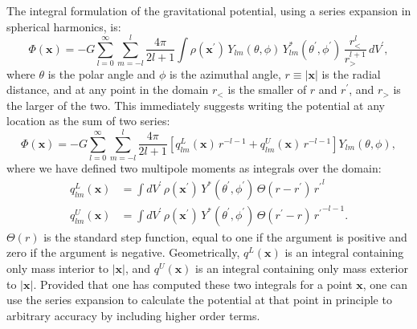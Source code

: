 \documentclass[12pt]{article}
\begin{document}
The integral formulation of the gravitational potential, using a series expansion in spherical harmonics, is:
\begin{equation}
  \Phi(\mathbf{x}) = -G\sum_{l=0}^{\infty} \sum_{m=-l}^{l} \frac{4\pi}{2l+1} \int \rho(\mathbf{x}^\prime)\, Y_{lm}(\theta,\phi)\, Y_{lm}^*(\theta^\prime,\phi^\prime)\, \frac{r_{<}^{l}}{r_{>}^{l+1}}\, dV^\prime,
\end{equation}
where $\theta$ is the polar angle and $\phi$ is the azimuthal angle, $r \equiv |\mathbf{x}|$ is the radial distance, and at any point in the domain $r_{<}$ is the smaller of $r$ and $r^\prime$, and $r_{>}$ is the larger of the two. This immediately suggests writing the potential at any location as the sum of
two series:
\begin{equation*}
  \Phi(\mathbf{x}) = -G\sum_{l=0}^{\infty} \sum_{m=-l}^{l} \frac{4\pi}{2l+1}\left[ q^{L}_{lm}(\mathbf{x})\, r^{-l-1} + q^{U}_{lm}(\mathbf{x})\, r^{-l-1} \right] Y_{lm}(\theta,\phi),
\end{equation*}
where we have defined two multipole moments as integrals over the domain:
\begin{align}
  q^{L}_{lm}(\mathbf{x}) &= \int dV^\prime\, \rho(\mathbf{x}^\prime)\, Y^*(\theta^\prime,\phi^\prime)\, \Theta(r - r^\prime)\, {r^\prime}^{l} \\
  q^{U}_{lm}(\mathbf{x}) &= \int dV^\prime\, \rho(\mathbf{x}^\prime)\, Y^*(\theta^\prime,\phi^\prime)\, \Theta(r^\prime - r)\, {r^\prime}^{-l-1}.
\end{align}
$\Theta(r)$ is the standard step function, equal to one if the argument is positive and zero if the argument is negative. Geometrically,
$q^{L}(\mathbf{x})$ is an integral containing only mass interior to $|\mathbf{x}|$, and $q^{U}(\mathbf{x})$ is an integral containing only
mass exterior to $|\mathbf{x}|$. Provided that one has computed these two integrals for a point $\mathbf{x}$, one can use the series expansion
to calculate the potential at that point in principle to arbitrary accuracy by including higher order terms.
  
\end{document}
